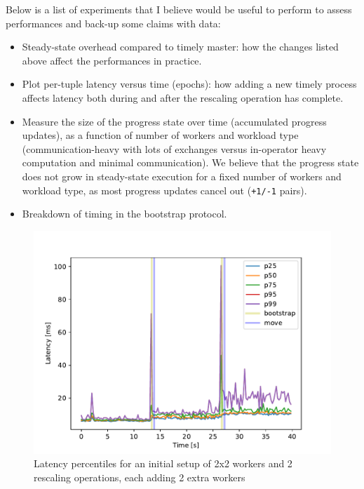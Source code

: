 \documentclass[12pt]{extarticle}
\begin{document}
Below is a list of experiments that I believe would be useful to perform to assess performances and back-up some claims with data:

\begin{itemize}
    \item Steady-state overhead compared to timely master: how the changes listed above affect the performances in practice.
    \item Plot per-tuple latency versus time (epochs): how adding a new timely process affects latency both during and after the
        rescaling operation has complete.
    \item Measure the size of the progress state over time (accumulated progress updates), as a function of
        number of workers and workload type (communication-heavy with lots of exchanges versus in-operator heavy computation and minimal communication).
        We believe that the progress state does not grow in steady-state execution for a fixed number of workers and workload type, as most progress updates
        cancel out (\verb|+1/-1| pairs).
    \item Breakdown of timing in the bootstrap protocol.
\end{itemize}

\begin{figure}[h]
    \centerline{\includegraphics[width=\linewidth]{imgs/latency.pdf}}
    \caption{Latency percentiles for an initial setup of 2x2 workers and 2 rescaling operations, each adding 2 extra workers}
    \label{fig:latency}
\end{figure}
\end{document}
